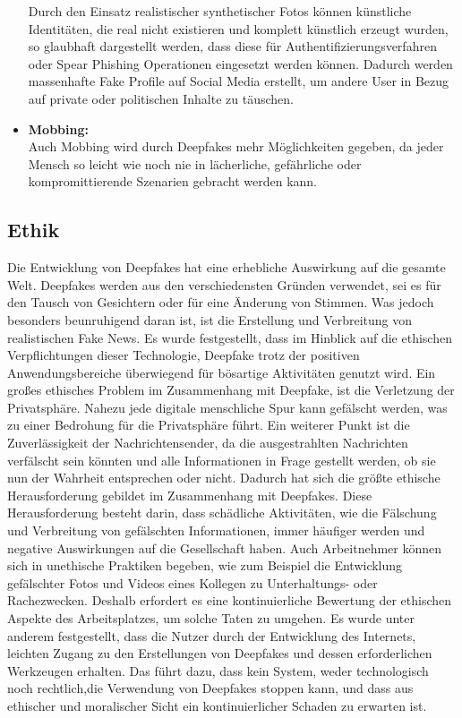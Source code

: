 \begin{itemize}
    Durch den Einsatz realistischer synthetischer Fotos können künstliche Identitäten, die real nicht existieren und komplett künstlich erzeugt wurden, so glaubhaft dargestellt werden, dass diese für Authentifizierungsverfahren oder Spear Phishing Operationen eingesetzt werden können. Dadurch werden massenhafte Fake Profile auf Social Media erstellt, um andere User in Bezug auf private oder politischen Inhalte zu täuschen.\cite{SpringerLink}
    \item \textbf{Mobbing:} \\
    Auch Mobbing wird durch Deepfakes mehr Möglichkeiten gegeben, da jeder Mensch so leicht wie noch nie in lächerliche, gefährliche oder kompromittierende Szenarien gebracht werden kann.\cite{ResearchGate}
\end{itemize}

\subsection{Ethik}

Die Entwicklung von Deepfakes hat eine erhebliche Auswirkung auf die gesamte Welt. Deepfakes werden aus den verschiedensten Gründen verwendet, sei es für den Tausch von Gesichtern oder für eine Änderung von Stimmen.\newline
Was jedoch besonders beunruhigend daran ist, ist die Erstellung und Verbreitung von realistischen Fake News. Es wurde festgestellt, dass im Hinblick auf die ethischen Verpflichtungen dieser Technologie, Deepfake trotz der positiven Anwendungsbereiche überwiegend für bösartige Aktivitäten genutzt wird.\newline
Ein großes ethisches Problem im Zusammenhang mit Deepfake, ist die Verletzung der Privatsphäre. Nahezu jede digitale menschliche Spur kann gefälscht werden, was zu einer Bedrohung für die Privatsphäre führt. Ein weiterer Punkt ist die Zuverlässigkeit der Nachrichtensender, da die ausgestrahlten Nachrichten verfälscht sein könnten und alle Informationen in Frage gestellt werden, ob sie nun der Wahrheit entsprechen oder nicht.\newline
Dadurch hat sich die größte ethische Herausforderung gebildet im Zusammenhang mit Deepfakes. Diese Herausforderung besteht darin, dass schädliche Aktivitäten, wie die Fälschung und Verbreitung von gefälschten Informationen, immer häufiger werden und negative Auswirkungen auf die Gesellschaft haben.\newline
Auch Arbeitnehmer können sich in unethische Praktiken begeben, wie zum Beispiel die Entwicklung gefälschter Fotos und Videos eines Kollegen zu Unterhaltungs- oder Rachezwecken. Deshalb erfordert es eine kontinuierliche Bewertung der ethischen Aspekte des Arbeitsplatzes, um solche Taten zu umgehen.
Es wurde unter anderem festgestellt, dass die Nutzer durch der Entwicklung des Internets, leichten Zugang zu den Erstellungen von Deepfakes und dessen erforderlichen Werkzeugen erhalten. Das führt dazu, dass kein System, weder technologisch noch rechtlich,die Verwendung von Deepfakes stoppen kann, und dass aus ethischer und moralischer Sicht ein kontinuierlicher Schaden zu erwarten ist.\cite{Jatit}
